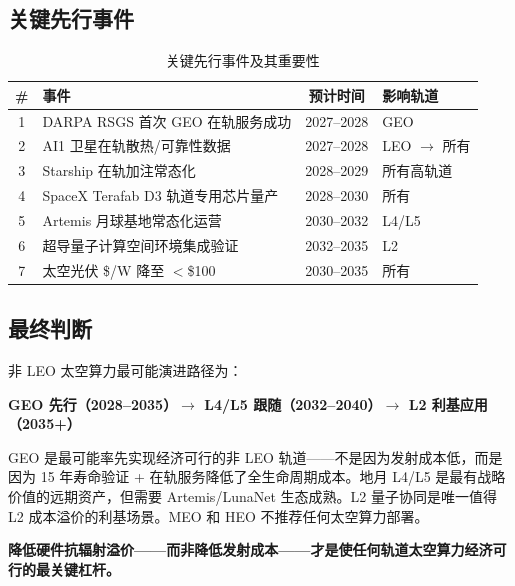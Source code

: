 \subsection{关键先行事件}

\begin{table}[H]
\centering
\caption{关键先行事件及其重要性}
\label{tab:key-events}
\small
\begin{tabular}{@{}clcl@{}}
\toprule
\textbf{\#} & \textbf{事件} & \textbf{预计时间} & \textbf{影响轨道} \\
\midrule
1 & DARPA RSGS 首次 GEO 在轨服务成功 & 2027--2028 & GEO \hspace{4em} \\
2 & AI1 卫星在轨散热/可靠性数据 & 2027--2028 & LEO $\rightarrow$ 所有 \\
3 & Starship 在轨加注常态化 & 2028--2029 & 所有高轨道 \\
4 & SpaceX Terafab D3 轨道专用芯片量产 & 2028--2030 & 所有 \\
5 & Artemis 月球基地常态化运营 & 2030--2032 & L4/L5 \\
6 & 超导量子计算空间环境集成验证 & 2032--2035 & L2 \\
7 & 太空光伏 \$/W 降至 $<$\$100 & 2030--2035 & 所有 \\
\bottomrule
\end{tabular}
\end{table}

\subsection{最终判断}

非 LEO 太空算力最可能演进路径为：

\begin{center}
\Large
\textbf{GEO 先行（2028--2035）$\rightarrow$ L4/L5 跟随（2032--2040）$\rightarrow$ L2 利基应用（2035+）}
\end{center}

\bigskip

GEO 是最可能率先实现经济可行的非 LEO 轨道——不是因为发射成本低，而是因为 15 年寿命验证 + 在轨服务降低了全生命周期成本。地月 L4/L5 是最有战略价值的远期资产，但需要 Artemis/LunaNet 生态成熟。L2 量子协同是唯一值得 L2 成本溢价的利基场景。MEO 和 HEO 不推荐任何太空算力部署。

\textbf{降低硬件抗辐射溢价——而非降低发射成本——才是使任何轨道太空算力经济可行的最关键杠杆。}
